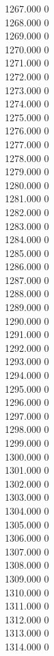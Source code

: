 { 1267.000	0 \\
 1268.000	0 \\
 1269.000	0 \\
 1270.000	0 \\
 1271.000	0 \\
 1272.000	0 \\
 1273.000	0 \\
 1274.000	0 \\
 1275.000	0 \\
 1276.000	0 \\
 1277.000	0 \\
 1278.000	0 \\
 1279.000	0 \\
 1280.000	0 \\
 1281.000	0 \\
 1282.000	0 \\
 1283.000	0 \\
 1284.000	0 \\
 1285.000	0 \\
 1286.000	0 \\
 1287.000	0 \\
 1288.000	0 \\
 1289.000	0 \\
 1290.000	0 \\
 1291.000	0 \\
 1292.000	0 \\
 1293.000	0 \\
 1294.000	0 \\
 1295.000	0 \\
 1296.000	0 \\
 1297.000	0 \\
 1298.000	0 \\
 1299.000	0 \\
 1300.000	0 \\
 1301.000	0 \\
 1302.000	0 \\
 1303.000	0 \\
 1304.000	0 \\
 1305.000	0 \\
 1306.000	0 \\
 1307.000	0 \\
 1308.000	0 \\
 1309.000	0 \\
 1310.000	0 \\
 1311.000	0 \\
 1312.000	0 \\
 1313.000	0 \\
 1314.000	0 \\
}
